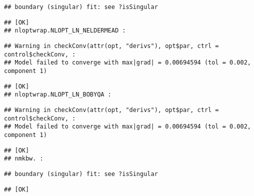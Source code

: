 \documentclass[
]{article}
\begin{document}
\begin{verbatim}
## boundary (singular) fit: see ?isSingular
\end{verbatim}

\begin{verbatim}
## [OK]
## nloptwrap.NLOPT_LN_NELDERMEAD :
\end{verbatim}

\begin{verbatim}
## Warning in checkConv(attr(opt, "derivs"), opt$par, ctrl = control$checkConv, :
## Model failed to converge with max|grad| = 0.00694594 (tol = 0.002, component 1)
\end{verbatim}

\begin{verbatim}
## [OK]
## nloptwrap.NLOPT_LN_BOBYQA :
\end{verbatim}

\begin{verbatim}
## Warning in checkConv(attr(opt, "derivs"), opt$par, ctrl = control$checkConv, :
## Model failed to converge with max|grad| = 0.00694594 (tol = 0.002, component 1)
\end{verbatim}

\begin{verbatim}
## [OK]
## nmkbw. :
\end{verbatim}

\begin{verbatim}
## boundary (singular) fit: see ?isSingular
\end{verbatim}

\begin{verbatim}
## [OK]
\end{verbatim}
\end{document}
